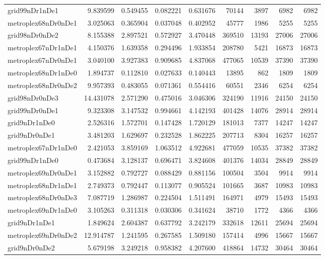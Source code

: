 \begin{longtable}{|l|r|r|r|r|r|r|r|r|}
grid99nDr1nDe1 & 9.839599 & 0.549455 & 0.082221 & 0.631676 & 70144 & 3897 & 6982 & 6982 \\
metroplex68nDr0nDe1 & 3.025063 & 0.365904 & 0.037048 & 0.402952 & 45777 & 1986 & 5255 & 5255 \\
grid98nDr0nDe2 & 8.155388 & 2.897521 & 0.572927 & 3.470448 & 369510 & 13193 & 27006 & 27006 \\
metroplex67nDr1nDe1 & 4.150376 & 1.639358 & 0.294496 & 1.933854 & 208780 & 5421 & 16873 & 16873 \\
metroplex67nDr0nDe1 & 3.040100 & 3.927383 & 0.909685 & 4.837068 & 477065 & 10539 & 37390 & 37390 \\
metroplex68nDr1nDe0 & 1.894737 & 0.112810 & 0.027633 & 0.140443 & 13895 & 862 & 1809 & 1809 \\
metroplex68nDr0nDe2 & 9.957393 & 0.483055 & 0.071361 & 0.554416 & 60551 & 2346 & 6254 & 6254 \\
grid98nDr0nDe3 & 14.431078 & 2.571290 & 0.475016 & 3.046306 & 324190 & 11916 & 24150 & 24150 \\
grid99nDr0nDe1 & 9.323308 & 3.147532 & 0.994661 & 4.142193 & 401428 & 14076 & 28914 & 28914 \\
grid9nDr1nDe0 & 2.526316 & 1.572701 & 0.147428 & 1.720129 & 181013 & 7377 & 14247 & 14247 \\
grid9nDr0nDe1 & 3.481203 & 1.629697 & 0.232528 & 1.862225 & 207713 & 8304 & 16257 & 16257 \\
metroplex67nDr1nDe0 & 2.421053 & 3.859169 & 1.063512 & 4.922681 & 477059 & 10535 & 37382 & 37382 \\
grid99nDr1nDe0 & 0.473684 & 3.128137 & 0.696471 & 3.824608 & 401376 & 14034 & 28849 & 28849 \\
metroplex69nDr0nDe1 & 3.152882 & 0.792727 & 0.088429 & 0.881156 & 100504 & 3504 & 9914 & 9914 \\
metroplex68nDr1nDe1 & 2.749373 & 0.792447 & 0.113077 & 0.905524 & 101665 & 3687 & 10983 & 10983 \\
metroplex68nDr0nDe3 & 7.087719 & 1.286987 & 0.224504 & 1.511491 & 164971 & 4979 & 15493 & 15493 \\
metroplex69nDr1nDe0 & 3.105263 & 0.311318 & 0.030306 & 0.341624 & 38710 & 1772 & 4366 & 4366 \\
grid9nDr1nDe1 & 1.849624 & 2.604387 & 0.637792 & 3.242179 & 332618 & 12611 & 25694 & 25694 \\
metroplex69nDr0nDe2 & 12.914787 & 1.241595 & 0.267585 & 1.509180 & 157414 & 4996 & 15667 & 15667 \\
grid9nDr0nDe2 & 5.679198 & 3.249218 & 0.958382 & 4.207600 & 418864 & 14732 & 30464 & 30464 \\

\end{longtable}
